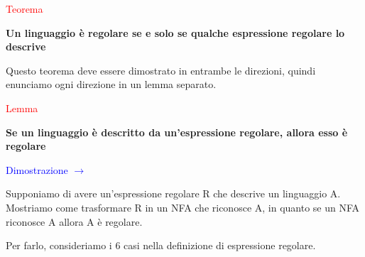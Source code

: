 \documentclass{article}
\begin{document}
\begin{center}
    \textcolor{red}{Teorema}
    
    \textbf{Un linguaggio è regolare se e solo se qualche espressione regolare lo descrive}
\end{center}

\noindent Questo teorema deve essere dimostrato in entrambe le direzioni, quindi enunciamo ogni direzione in un lemma separato.

\begin{center}
    \textcolor{red}{Lemma}

    \textbf{Se un linguaggio è descritto da un'espressione regolare, allora esso è regolare}
\end{center}

\textcolor{blue}{Dimostrazione $\rightarrow$}

Supponiamo di avere un'espressione regolare R che descrive un linguaggio A. Mostriamo come trasformare R in un NFA che riconosce A, in quanto se un NFA riconosce A allora A è regolare.

Per farlo, consideriamo i 6 casi nella definizione di espressione regolare.
\end{document}
